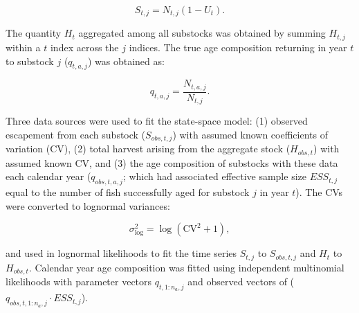 \documentclass[12pt,]{book}
\theoremstyle{definition}
\theoremstyle{definition}
\theoremstyle{definition}
\theoremstyle{remark}
\begin{document}
\begin{equation}
  S_{t,j}=N_{t,j} (1 - U_t).
  \label{eq:tsm-get-S}
\end{equation}

The quantity \(H_t\) aggregated among all substocks was obtained by
summing \(H_{t,j}\) within a \(t\) index across the \(j\) indices. The
true age composition returning in year \(t\) to substock \(j\)
(\(q_{t,a,j}\)) was obtained as:

\begin{equation}
  q_{t,a,j} = \frac{N_{t,a,j}}{N_{t,j}}.
  \label{eq:get-q}
\end{equation}

Three data sources were used to fit the state-space model: (1) observed
escapement from each substock (\(S_{obs,t,j}\)) with assumed known
coefficients of variation (CV), (2) total harvest arising from the
aggregate stock (\(H_{obs,t}\)) with assumed known CV, and (3) the age
composition of substocks with these data each calendar year
(\(q_{obs,t,a,j}\); which had associated effective sample size
\(ESS_{t,j}\) equal to the number of fish successfully aged for substock
\(j\) in year \(t\)). The CVs were converted to lognormal variances:

\begin{equation}
  \sigma^2_{\text{log}}=\log(\text{CV}^2+1),
  \label{eq:cv2sig}
\end{equation}

\noindent
and used in lognormal likelihoods to fit the time series \(S_{t,j}\) to
\(S_{obs,t,j}\) and \(H_t\) to \(H_{obs,t}\). Calendar year age
composition was fitted using independent multinomial likelihoods with
parameter vectors \(q_{t,1:n_a,j}\) and observed vectors of
(\(q_{obs,t,1:n_a,j} \cdot ESS_{t,j}\)).
\end{document}
